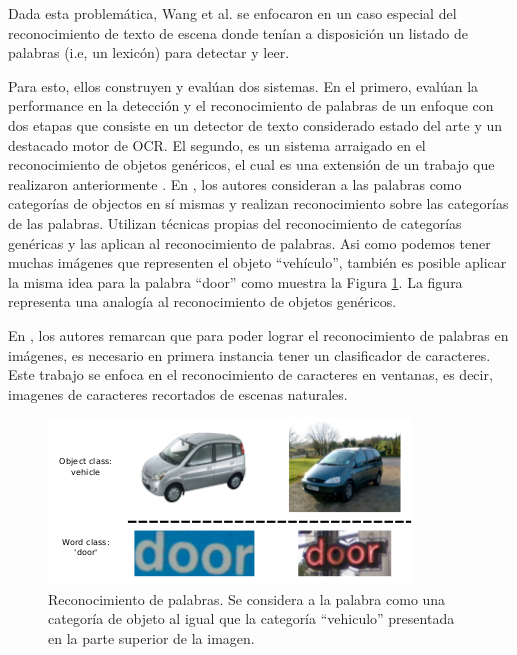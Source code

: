 	Dada esta problemática, Wang et al. se enfocaron en un caso especial del reconocimiento de texto de escena donde tenían a disposición un listado de palabras (i.e, un lexicón) para detectar y leer.
		
	Para esto, ellos construyen y evalúan dos sistemas. En el primero, evalúan la performance en la detección y el reconocimiento de palabras de un enfoque con dos etapas que consiste en un detector de texto considerado estado del arte y un destacado motor de OCR. El segundo, es un sistema arraigado en el reconocimiento de objetos genéricos, el cual es una extensión de un trabajo que realizaron anteriormente \cite{WB10}. En \cite{WB10}, los autores consideran a las palabras como categorías de objectos en sí mismas y realizan reconocimiento sobre las categorías de las palabras. Utilizan técnicas propias del reconocimiento de categorías genéricas y las aplican al reconocimiento de palabras. Asi como podemos tener muchas imágenes que representen el objeto ``vehículo'', también es posible aplicar la misma idea para la palabra ``door'' como muestra la Figura \ref{fig: Reconocimiento generico}. La figura representa una analogía al reconocimiento de objetos genéricos.
	
	En \cite{wang}, los autores remarcan que para poder lograr el reconocimiento de palabras en imágenes, es necesario en primera instancia tener un clasificador de caracteres. Este trabajo se enfoca en el reconocimiento de caracteres en ventanas, es decir, imagenes de caracteres recortados de escenas naturales. 
	
	
	
	\begin{figure}[htbp]
		\centering
		\centerline{ \includegraphics[scale=0.5]{img/object_recognition.png} }
		\caption[Reconocimiento generico de objetos]{Reconocimiento de palabras. Se considera a la palabra como una categoría de objeto al igual que la categoría ``vehiculo'' presentada en la parte superior de la imagen.}
		\label{fig: Reconocimiento generico}
	\end{figure}
